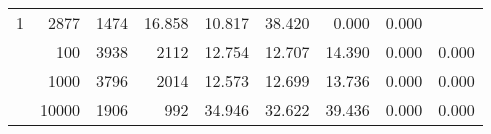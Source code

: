 \begin{table}
\begin{tabular}{rrrrrrrrr}
					\multirow{ 1 }{*}{ 1 } &
					
						
							    
							     2877  & 1474  
	                           & 16.858 & 10.817 & 38.420
	                           & 0.000 & 0.000  \\
	                
	            
					 &  
					 
					\multirow{ 1 }{*}{ 100 } &
					
						
							    
							     3938  & 2112  
	                           & 12.754 & 12.707 & 14.390
	                           & 0.000 & 0.000  \\
	                
	            
					 &  
					 
					\multirow{ 1 }{*}{ 1000 } &
					
						
							    
							     3796  & 2014  
	                           & 12.573 & 12.699 & 13.736
	                           & 0.000 & 0.000  \\
	                
	            
					 &  
					 
					\multirow{ 1 }{*}{ 10000 } &
					
						
							    
							     1906  & 992  
	                           & 34.946 & 32.622 & 39.436
	                           & 0.000 & 0.000  \\
	                
	            
	        

\hline

\end{tabular}
\end{table}
\clearpage


	    

